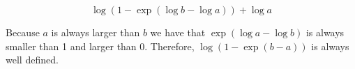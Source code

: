 \documentclass[10pt]{harvardml}
\theoremstyle{plain}
\begin{document}
\[\log(1 - \exp(\log b - \log a))+\log a \]

\noindent Because $a$ is always larger than $b$ we have that $\exp(\log a- \log b )$
is always smaller than 1 and larger than 0. Therefore,
$\log(1 - \exp(b - a))$ is always well defined.




\end{document}
